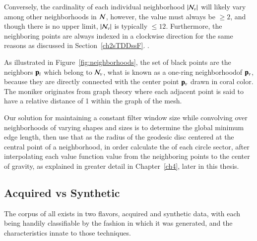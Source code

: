 Conversely, the cardinality of each individual neighborhood $|\mathcal{N}_v|$ will likely vary among other neighborhoods in $\mathcal{N}$, however, the value must always be $\geq 2$, and though there is no upper limit, $|\mathcal{N}_v|$ is typically $\leq 12$. Furthermore, the neighboring points are always indexed in a clockwise direction for the same reasons as discussed in Section~\ref{ch2sTDDssF}.
.%

As illustrated in Figure~\ref{fig:neighborhoods}, the set of black points are the neighbors $\mathbf{p}_i$ which belong to $\mathcal{N}_v$, what is known as a one-ring neighborhood\footnotemark of $\mathbf{p}_v$, because they are directly connected with the center point $\mathbf{p}_v$ drawn in coral color. The moniker originates from graph theory where each adjacent point is said to have a relative distance of 1 within the graph of the mesh. 

Our solution for maintaining a constant filter window size while convolving  over neighborhoods of varying shapes and sizes is to determine the global minimum edge length, then use that as the radius of the geodesic disc centered at the central point of a neighborhood, in order calculate the  of each circle sector, after interpolating each value function value from the neighboring points to the center of gravity, as explained in greater detail in Chapter~\ref{ch4}, later in this thesis.

%
%
%
%
\subsection{Acquired vs Synthetic \tdd{}}
\label{ch2sTDDssAVS3}
The corpus of all \tdd{} exists in two flavors, acquired and synthetic data, with each being handily classifiable by the fashion in which it was generated, and the characteristics innate to those techniques.

